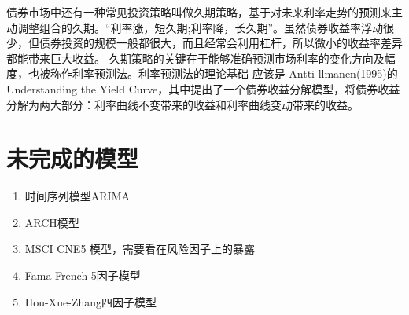 \documentclass[11pt,oneside,a4paper,notitlepage]{article}
\begin{document}
\begin{CJK}{UTF8}{gbsn}
债券市场中还有一种常见投资策略叫做久期策略，基于对未来利率走势的预测来主动调整组合的久期。“利率涨，短久期;利率降，长久期”。虽然债券收益率浮动很少，但债券投资的规模一般都很大，而且经常会利用杠杆，所以微小的收益率差异都能带来巨大收益。
久期策略的关键在于能够准确预测市场利率的变化方向及幅度，也被称作利率预测法。利率预测法的理论基础
应该是 Antti llmanen(1995)的 Understanding the Yield Curve，其中提出了一个债券收益分解模型，将债券收益分解为两大部分：利率曲线不变带来的收益和利率曲线变动带来的收益。 

\section{未完成的模型}
\begin{enumerate}
    \item 时间序列模型ARIMA
    \item ARCH模型
    \item MSCI CNE5 模型，需要看在风险因子上的暴露
    \item Fama-French 5因子模型
    \item Hou-Xue-Zhang四因子模型
\end{enumerate}


\end{CJK}
\end{document}
